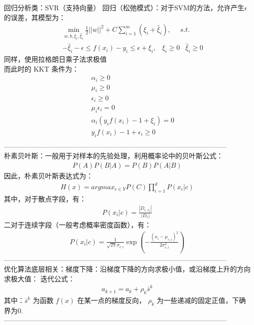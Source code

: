 \documentclass{article}
\begin{document}
\noindent 回归分析类：SVR（支持向量） 回归（松弛模式）：对于SVM的方法，允许产生$\epsilon$的误差，其模型为：\\
\begin{eqnarray*}
&&\min_{w,b,\xi_{i},\hat{\xi}_{i}}\frac{1}{2}||w||^{2} + C\sum_{i=1}^{m}(\xi_{i} + \hat{\xi}_{i}),\,\,\,\,\,\,\,\,s.t.\\
&&-\hat{\xi}_{i} - \epsilon\leq f(x_{i})-y_{i} \leq \epsilon + \xi_{i},\,\,\,\,\, \xi_{i} \ge 0\,\,\,\,\, \hat{\xi}_{i} \ge 0
\end{eqnarray*}
同样，使用拉格朗日乘子法求极值\\
而此时的 KKT 条件为：
\begin{eqnarray*}
&&\alpha_{i} \ge 0\\
&&\mu_{i} \ge 0\\
&&\epsilon_{i} \ge 0\\
&&\mu_{i}\epsilon_{i}=0\\
&&\alpha_{i}(y_{i}f(x_{i}) - 1 + \xi_{i}) = 0\\
&&y_{i}f(x_{i}) - 1+\epsilon_{i} \ge 0\\
\end{eqnarray*}
--------------------------------------------------------------------------------------------------\\

\noindent 朴素贝叶斯：一般用于对样本的先验处理，利用概率论中的贝叶斯公式：
\begin{eqnarray*}
P(A)P(B|A) = P(B)P(A|B)
\end{eqnarray*}
因此，朴素贝叶斯表达式为：
\begin{eqnarray*}
H(x) = argmax_{c\in Y} P(C)\prod_{i=1}^{d}P(x_{i}|c)
\end{eqnarray*}
其中，对于散点字段，有：
\begin{eqnarray*}
P(x_{i}|c) = \frac{|D_{c, x_{i}}|}{|D_{c}|}
\end{eqnarray*}
二对于连续字段（一般考虑概率密度函数），有：
\begin{eqnarray*}
P(x_{i}|c) = \frac{1}{\sqrt{2\pi}\sigma_{c,i}}\exp{(-\frac{(x_{i}-\mu_{c,i})^{2}}{2\sigma_{c,i}^{2}})}
\end{eqnarray*}
--------------------------------------------------------------------------------------------------\\

\noindent 优化算法底层相关：梯度下降：沿梯度下降的方向求极小值，或沿梯度上升的方向求极大值：
迭代公式：
\begin{eqnarray*}
a_{k+1} = a_{k} + \rho_{k}\bar{s}^{k}
\end{eqnarray*}
其中：$\bar{s}^{k}$ 为函数 $f(x)$ 在某一点的梯度反向， $\rho_{k}$ 为一些递减的固定正值，下确界为0.\\
--------------------------------------------------------------------------------------------------\\
\end{document}
